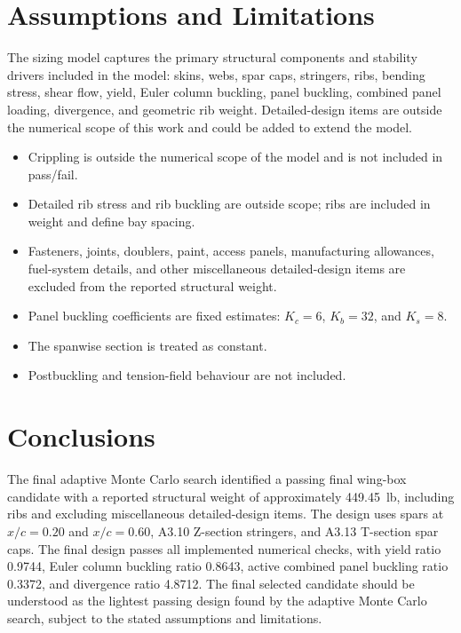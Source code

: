 \documentclass[11pt]{article}
\begin{document}
\section{Assumptions and Limitations}

The sizing model captures the primary structural components and stability drivers included in the model: skins, webs, spar caps, stringers, ribs, bending stress, shear flow, yield, Euler column buckling, panel buckling, combined panel loading, divergence, and geometric rib weight. Detailed-design items are outside the numerical scope of this work and could be added to extend the model.

\begin{itemize}
  \item Crippling is outside the numerical scope of the model and is not included in pass/fail.
  \item Detailed rib stress and rib buckling are outside scope; ribs are included in weight and define bay spacing.
  \item Fasteners, joints, doublers, paint, access panels, manufacturing allowances, fuel-system details, and other miscellaneous detailed-design items are excluded from the reported structural weight.
  \item Panel buckling coefficients are fixed estimates: $K_c=6$, $K_b=32$, and $K_s=8$.
  \item The spanwise section is treated as constant.
  \item Postbuckling and tension-field behaviour are not included.
\end{itemize}

\section{Conclusions}

The final adaptive Monte Carlo search identified a passing final wing-box candidate with a reported structural weight of approximately \SI{449.45}{lb}, including ribs and excluding miscellaneous detailed-design items. The design uses spars at $x/c=0.20$ and $x/c=0.60$, A3.10 Z-section stringers, and A3.13 T-section spar caps. The final design passes all implemented numerical checks, with yield ratio 0.9744, Euler column buckling ratio 0.8643, active combined panel buckling ratio 0.3372, and divergence ratio 4.8712. The final selected candidate should be understood as the lightest passing design found by the adaptive Monte Carlo search, subject to the stated assumptions and limitations.
\end{document}
